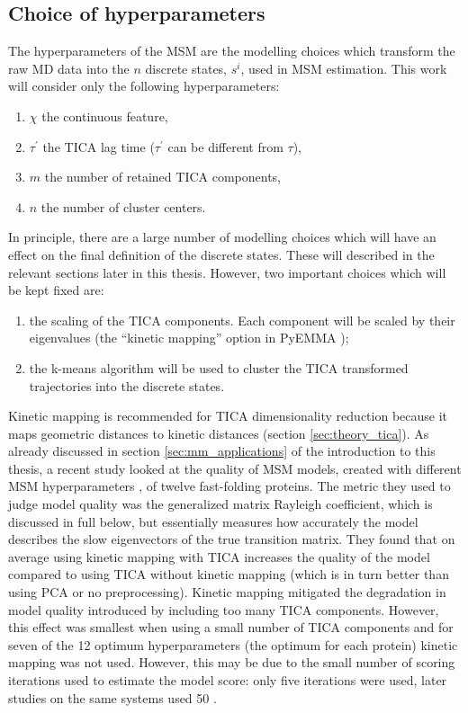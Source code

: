 \subsection{Choice of hyperparameters}\label{sec:theory_choice_hyp}
The hyperparameters of the MSM are the modelling choices which transform the raw MD data into the $n$ discrete states, $s^{i}$, used in MSM estimation. This work will consider only the following hyperparameters: 
\begin{enumerate}
    \item $\chi$ the continuous feature,
    \item $\tau^{\prime}$ the TICA lag time ($\tau^{\prime}$ can be different from $\tau$), 
    \item $m$ the number of retained TICA components, 
    \item $n$ the number of cluster centers. 
\end{enumerate}
In principle, there are a large number of modelling choices which will have an effect on the final definition of the discrete states. These will described in the relevant sections later in this thesis. However, two important choices which will be kept fixed are: 
\begin{enumerate}
    \item the scaling of the TICA components. Each component will be scaled by their eigenvalues (the ``kinetic mapping'' option in PyEMMA \cite{schererPyEMMASoftwarePackage2015a});
    \item the k-means \cite{lloydLeastSquaresQuantization1982} algorithm will be used to cluster the TICA transformed trajectories into the discrete states. 
\end{enumerate}


Kinetic mapping is recommended for TICA dimensionality reduction \cite{noeKineticDistanceKinetic2015} because it maps geometric distances to kinetic distances (section \ref{sec:theory_tica}).  As already discussed in section \ref{sec:mm_applications} of the introduction to this thesis, a recent study looked at the quality of MSM models, created with different MSM hyperparameters \cite{husicOptimizedParameterSelection2016}, of twelve fast-folding proteins. The metric they used to judge model quality was the generalized matrix Rayleigh coefficient, which is discussed in full below, but essentially measures how accurately the  model describes the slow eigenvectors of the true transition matrix.  They found that on average using kinetic mapping with TICA increases the quality of the model compared to using TICA without kinetic mapping (which is in turn better than using PCA or no preprocessing). Kinetic mapping  mitigated the degradation in model quality introduced by including too many TICA components. However, this effect was smallest when using a small number of TICA components and for seven of the 12 optimum hyperparameters (the optimum for each protein) kinetic mapping was not used.  However, this may be due to the small number of scoring iterations used to estimate the model score: only five iterations were used, later studies on the same systems used \num{50} \cite{schererVariationalSelectionFeatures2019}. 

